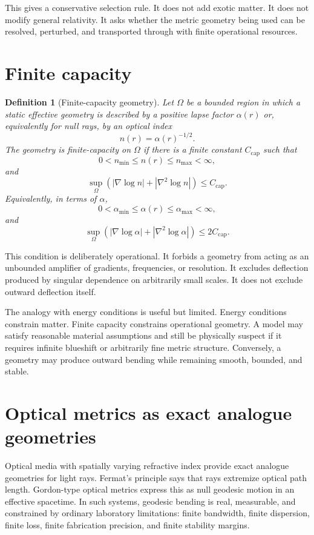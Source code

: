 \documentclass[11pt]{article}
\newtheorem{definition}{Definition}
\begin{document}
This gives a conservative selection rule.  It does not add exotic matter.  It does not modify general relativity.  It asks whether the metric geometry being used can be resolved, perturbed, and transported through with finite operational resources.

\section{Finite capacity}

\begin{definition}[Finite-capacity geometry]
Let $\Omega$ be a bounded region in which a static effective geometry is described by a positive lapse factor $\alpha(r)$ or, equivalently for null rays, by an optical index
\[
        n(r)=\alpha(r)^{-1/2}.
\]
The geometry is finite-capacity on $\Omega$ if there is a finite constant $C_{\mathrm{cap}}$ such that
\[
        0<n_{\min}\le n(r)\le n_{\max}<\infty,
\]
and
\[
        \sup_{\Omega}\left(
        |\nabla\log n|+|\nabla^2\log n|
        \right)
        \le C_{\mathrm{cap}}.
\]
Equivalently, in terms of $\alpha$,
\[
        0<\alpha_{\min}\le \alpha(r)\le \alpha_{\max}<\infty,
\]
and
\[
        \sup_{\Omega}\left(
        |\nabla\log \alpha|+|\nabla^2\log \alpha|
        \right)
        \le 2C_{\mathrm{cap}}.
\]
\end{definition}

This condition is deliberately operational.  It forbids a geometry from acting as an unbounded amplifier of gradients, frequencies, or resolution.  It excludes deflection produced by singular dependence on arbitrarily small scales.  It does not exclude outward deflection itself.

The analogy with energy conditions is useful but limited.  Energy conditions constrain matter.  Finite capacity constrains operational geometry.  A model may satisfy reasonable material assumptions and still be physically suspect if it requires infinite blueshift or arbitrarily fine metric structure.  Conversely, a geometry may produce outward bending while remaining smooth, bounded, and stable.

\section{Optical metrics as exact analogue geometries}

Optical media with spatially varying refractive index provide exact analogue geometries for light rays.  Fermat's principle says that rays extremize optical path length.  Gordon-type optical metrics express this as null geodesic motion in an effective spacetime.  In such systems, geodesic bending is real, measurable, and constrained by ordinary laboratory limitations: finite bandwidth, finite dispersion, finite loss, finite fabrication precision, and finite stability margins.
\end{document}
